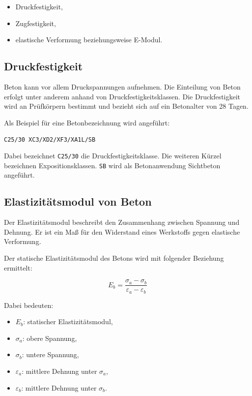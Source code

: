 \documentclass[
  12pt,
  a4paper,
  oneside
]{scrreprt}
\begin{document}
\begin{itemize}
  \item Druckfestigkeit,
  \item Zugfestigkeit,
  \item elastische Verformung beziehungsweise E-Modul.
\end{itemize}



\subsection{Druckfestigkeit}

Beton kann vor allem Druckspannungen aufnehmen. Die Einteilung von
Beton erfolgt unter anderem anhand von Druckfestigkeitsklassen. Die
Druckfestigkeit wird an Prüfkörpern bestimmt und bezieht sich auf ein
Betonalter von 28 Tagen.


Als Beispiel für eine Betonbezeichnung wird angeführt:

\begin{center}
\texttt{C25/30 XC3/XD2/XF3/XA1L/SB}
\end{center}

Dabei bezeichnet \texttt{C25/30} die Druckfestigkeitsklasse. Die
weiteren Kürzel bezeichnen Expositionsklassen. \texttt{SB} wird als
Betonanwendung Sichtbeton angeführt.


\subsection{Elastizitätsmodul von Beton}

Der Elastizitätsmodul beschreibt den Zusammenhang zwischen Spannung und
Dehnung. Er ist ein Maß für den Widerstand eines Werkstoffs gegen
elastische Verformung.


Der statische Elastizitätsmodul des Betons wird mit folgender Beziehung
ermittelt:

\begin{equation}
  E_b =
  \frac{\sigma_a - \sigma_b}
  {\varepsilon_a - \varepsilon_b}
\end{equation}

Dabei bedeuten:

\begin{itemize}
  \item $E_b$: statischer Elastizitätsmodul,
  \item $\sigma_a$: obere Spannung,
  \item $\sigma_b$: untere Spannung,
  \item $\varepsilon_a$: mittlere Dehnung unter $\sigma_a$,
  \item $\varepsilon_b$: mittlere Dehnung unter $\sigma_b$.
\end{itemize}
\end{document}
